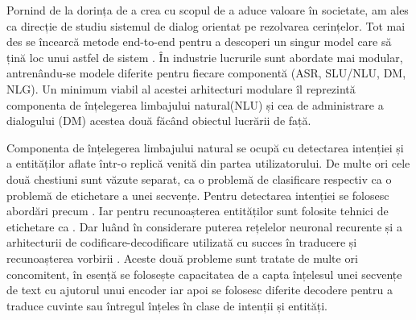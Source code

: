 Pornind de la dorința de a crea cu scopul de a aduce valoare în societate, am ales ca direcție de studiu sistemul de dialog orientat pe rezolvarea cerințelor. Tot mai des se încearcă metode end-to-end pentru a descoperi un singur model care să țină loc unui astfel de sistem \cite{end-to-end foal oriented}. În industrie lucrurile sunt abordate mai modular, antrenându-se modele diferite pentru fiecare componentă (ASR, SLU/NLU, DM, NLG). Un minimum viabil al acestei arhitecturi modulare îl reprezintă componenta de înțelegerea limbajului natural(NLU) și cea de administrare a dialogului (DM) acestea două făcând obiectul lucrării de față.

Componenta de înțelegerea limbajului natural se ocupă cu detectarea intenției și a entităților aflate într-o replică venită din partea utilizatorului. De multe ori cele două chestiuni sunt văzute separat, ca o problemă de clasificare respectiv ca o problemă de etichetare a unei secvențe.
Pentru detectarea intenției se folosesc abordări precum \cite{id_classifiers}. Iar pentru recunoașterea entităților sunt folosite tehnici de etichetare ca \cite{scipy_numpyeq_labeling}. Dar luând în considerare puterea rețelelor neuronal recurente și a arhitecturii de codificare-decodificare utilizată cu succes în traducere și recunoașterea vorbirii \cite{luoung_bahdanau_maning}. Aceste două probleme sunt tratate de multe ori concomitent, în esență se folosește capacitatea de a capta înțelesul unei secvențe de text cu ajutorul unui encoder iar apoi se folosesc diferite decodere pentru a traduce cuvinte sau întregul înțeles în clase de intenții și entități.



